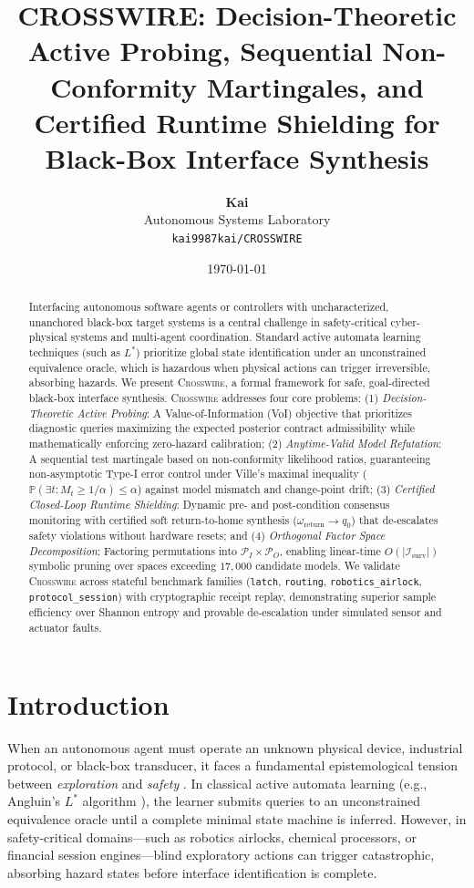 \documentclass[10pt,twocolumn,letterpaper]{article}
\title{\textbf{CROSSWIRE: Decision-Theoretic Active Probing, Sequential Non-Conformity Martingales, and Certified Runtime Shielding for Black-Box Interface Synthesis}}
\author{
    \textbf{Kai}\\
    Autonomous Systems Laboratory\\
    \texttt{kai9987kai/CROSSWIRE}
}
\date{\today}
\begin{document}
\maketitle

\begin{abstract}
Interfacing autonomous software agents or controllers with uncharacterized, unanchored black-box target systems is a central challenge in safety-critical cyber-physical systems and multi-agent coordination. Standard active automata learning techniques (such as $L^*$) prioritize global state identification under an unconstrained equivalence oracle, which is hazardous when physical actions can trigger irreversible, absorbing hazards. We present \textsc{Crosswire}, a formal framework for safe, goal-directed black-box interface synthesis. \textsc{Crosswire} addresses four core problems: (1) \emph{Decision-Theoretic Active Probing}: A Value-of-Information (VoI) objective that prioritizes diagnostic queries maximizing the expected posterior contract admissibility while mathematically enforcing zero-hazard calibration; (2) \emph{Anytime-Valid Model Refutation}: A sequential test martingale based on non-conformity likelihood ratios, guaranteeing non-asymptotic Type-I error control under Ville's maximal inequality ($\mathbb{P}(\exists t: M_t \ge 1/\alpha) \le \alpha$) against model mismatch and change-point drift; (3) \emph{Certified Closed-Loop Runtime Shielding}: Dynamic pre- and post-condition consensus monitoring with certified soft return-to-home synthesis ($\omega_{\text{return}} \to q_0$) that de-escalates safety violations without hardware resets; and (4) \emph{Orthogonal Factor Space Decomposition}: Factoring permutations into $\mathcal{P}_I \times \mathcal{P}_O$, enabling linear-time $O(|\mathcal{I}_{\text{surv}}|)$ symbolic pruning over spaces exceeding $17,000$ candidate models. We validate \textsc{Crosswire} across stateful benchmark families (\texttt{latch}, \texttt{routing}, \texttt{robotics\_airlock}, \texttt{protocol\_session}) with cryptographic receipt replay, demonstrating superior sample efficiency over Shannon entropy and provable de-escalation under simulated sensor and actuator faults.
\end{abstract}

\section{Introduction}
\label{sec:intro}

When an autonomous agent must operate an unknown physical device, industrial protocol, or black-box transducer, it faces a fundamental epistemological tension between \emph{exploration} and \emph{safety} \cite{elyaniv2010foundations, sha2001using}. In classical active automata learning (e.g., Angluin's $L^*$ algorithm \cite{angluin1987learning, steffen2012active}), the learner submits queries to an unconstrained equivalence oracle until a complete minimal state machine is inferred. However, in safety-critical domains---such as robotics airlocks, chemical processors, or financial session engines---blind exploratory actions can trigger catastrophic, absorbing hazard states before interface identification is complete.
\end{document}
